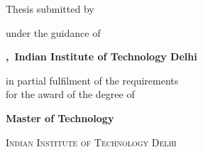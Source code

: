 \begin{titlepage}
\centering
\vspace*{1cm}


{\LARGE\bfseries \thesistitle \par}
\vspace{2cm}

{\large Thesis submitted by\par}
\vspace{0.5cm}
{\Large\bfseries \thesisauthor \par}
{\large \thesisentryno \par}
\vspace{1.5cm}

{\large under the guidance of\par}
\vspace{0.3cm}
{\large\bfseries \thesisguide,\ Indian Institute of Technology Delhi \par}
\vspace{1.5cm}

{\large in partial fulfilment of the requirements\\
for the award of the degree of\par}
\vspace{0.8cm}
{\large\bfseries Master of Technology\par}
\vspace{1.5cm}

{\large\bfseries \thesisdept \par}
{\large\scshape Indian Institute of Technology Delhi \par}
\vspace{0.8cm}
{\large \thesisdate \par}

\vfill
\end{titlepage}
